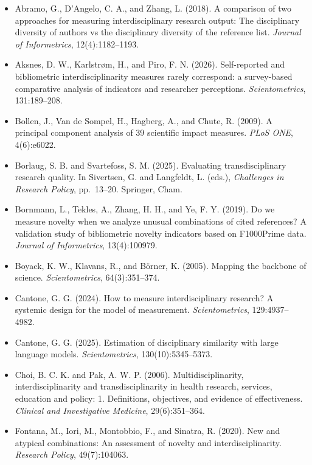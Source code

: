 \documentclass[
]{article}
\providecommand{\tightlist}{%
  \setlength{\itemsep}{0pt}\setlength{\parskip}{0pt}}
\begin{document}
\begin{itemize}
\tightlist
\item
  Abramo, G., D'Angelo, C. A., and Zhang, L. (2018). A comparison of two
  approaches for measuring interdisciplinary research output: The
  disciplinary diversity of authors vs the disciplinary diversity of the
  reference list. \emph{Journal of Informetrics}, 12(4):1182--1193.
\item
  Aksnes, D. W., Karlstrøm, H., and Piro, F. N. (2026). Self-reported
  and bibliometric interdisciplinarity measures rarely correspond: a
  survey-based comparative analysis of indicators and researcher
  perceptions. \emph{Scientometrics}, 131:189--208.
\item
  Bollen, J., Van de Sompel, H., Hagberg, A., and Chute, R. (2009). A
  principal component analysis of 39 scientific impact measures.
  \emph{PLoS ONE}, 4(6):e6022.
\item
  Borlaug, S. B. and Svartefoss, S. M. (2025). Evaluating
  transdisciplinary research quality. In Sivertsen, G. and Langfeldt, L.
  (eds.), \emph{Challenges in Research Policy}, pp.~13--20. Springer,
  Cham.
\item
  Bornmann, L., Tekles, A., Zhang, H. H., and Ye, F. Y. (2019). Do we
  measure novelty when we analyze unusual combinations of cited
  references? A validation study of bibliometric novelty indicators
  based on F1000Prime data. \emph{Journal of Informetrics},
  13(4):100979.
\item
  Boyack, K. W., Klavans, R., and Börner, K. (2005). Mapping the
  backbone of science. \emph{Scientometrics}, 64(3):351--374.
\item
  Cantone, G. G. (2024). How to measure interdisciplinary research? A
  systemic design for the model of measurement. \emph{Scientometrics},
  129:4937--4982.
\item
  Cantone, G. G. (2025). Estimation of disciplinary similarity with
  large language models. \emph{Scientometrics}, 130(10):5345--5373.
\item
  Choi, B. C. K. and Pak, A. W. P. (2006). Multidisciplinarity,
  interdisciplinarity and transdisciplinarity in health research,
  services, education and policy: 1. Definitions, objectives, and
  evidence of effectiveness. \emph{Clinical and Investigative Medicine},
  29(6):351--364.
\item
  Fontana, M., Iori, M., Montobbio, F., and Sinatra, R. (2020). New and
  atypical combinations: An assessment of novelty and
  interdisciplinarity. \emph{Research Policy}, 49(7):104063.

\end{itemize}
\end{document}

